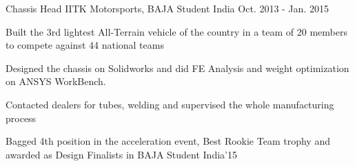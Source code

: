 

\begin{cventries}
	\cventry
	{Chassis Head} %
	{IITK Motorsports, BAJA Student India} %
	{Oct. 2013 - Jan. 2015} %
	{} %
	{
		\begin{cvitems} %
			\item {Built the 3rd lightest All-Terrain vehicle of the country in a team of 20 members to compete against 44 national teams}
			\item { Designed the chassis on Solidworks and did FE Analysis and weight optimization on ANSYS WorkBench.}
			\item {
				Contacted dealers for tubes, welding and supervised the whole manufacturing process
			}
			\item { Bagged 4th position in the acceleration event, Best Rookie Team trophy and awarded as Design Finalists in BAJA Student India’15 }
		\end{cvitems}
	}

  
\end{cventries}
